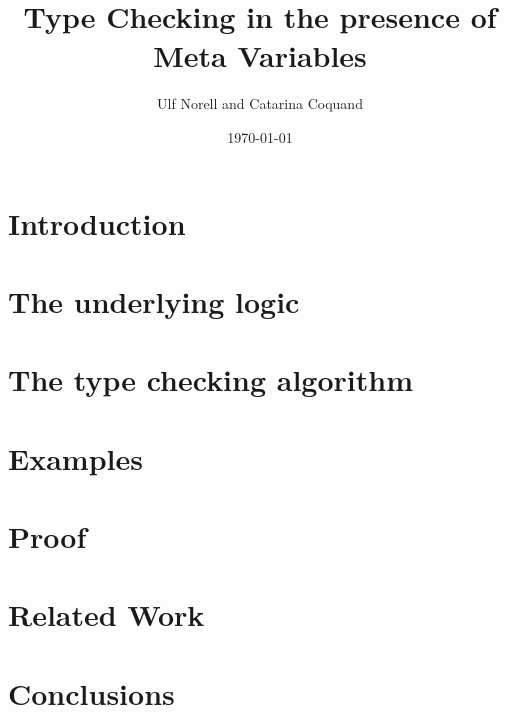 \documentclass[11pt]{llncs}
\title{Type Checking in the presence of Meta Variables}
\author{Ulf Norell and Catarina Coquand}
\institute{Chalmers University of Technology}
\date{\today}
\begin{document}
\maketitle



\section{Introduction} 

\section{The underlying logic \Core} 

\section{The type checking algorithm} \label{secRules} 

\section{Examples} 

\section{Proof} 

\section{Related Work} 

\section{Conclusions} 



\end{document}

